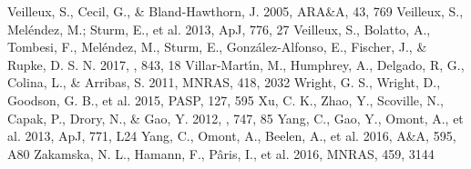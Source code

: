 \documentclass{pasa}%
\begin{document}
\begin{thebibliography}{}
   Veilleux, S., Cecil, G., \&
    Bland-Hawthorn, J. 2005, ARA\&A, 43, 769
   Veilleux, S., Mel\'endez, M.; Sturm,
    E., et al. 2013, ApJ, 776, 27 
   Veilleux, S., Bolatto, A., Tombesi,
    F., Mel\'endez, M., Sturm, E., Gonz\'alez-Alfonso, E., Fischer, J., \&
    Rupke, D. S. N. 2017, \apj, 843, 18
   Villar-Mart\'{\i}n, M.,
    Humphrey, A., Delgado, R, G., Colina, L., \&  Arribas, S. 2011, MNRAS,
    418, 2032 
   Wright, G. S., Wright, D., Goodson,
    G. B., et al. 2015, PASP, 127, 595
   Xu, C. K., Zhao, Y., Scoville, N., Capak,
    P., Drory, N., \& Gao, Y. 2012, \apj, 747, 85
   Yang, C., Gao, Y., Omont, A., et
    al. 2013, ApJ, 771, L24 
   Yang, C., Omont, A., Beelen, A., et
    al. 2016, A\&A, 595, A80 
   Zakamska, N. L., Hamann, F., P\^aris,
    I., et al. 2016, MNRAS, 459, 3144


\end{thebibliography}

\nocite*{}


\end{document}
